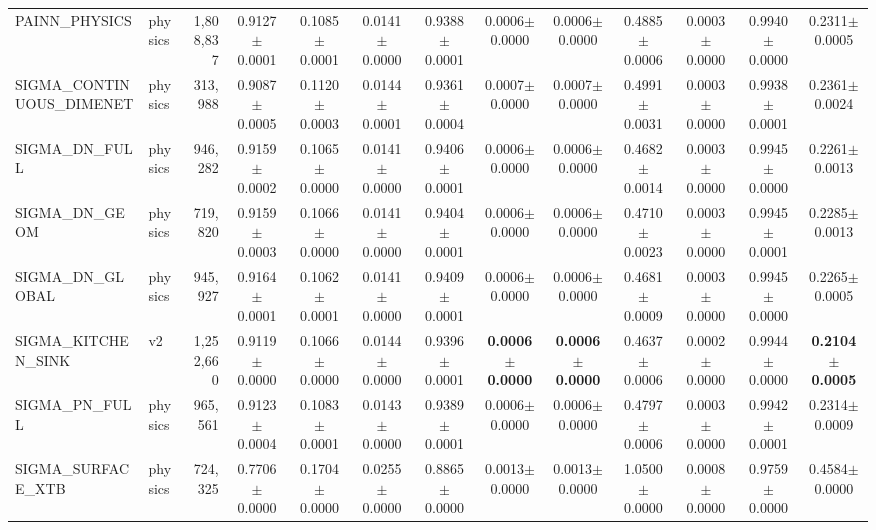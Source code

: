\begin{table}[ht]
\begin{tabular}{l l r c c c c c c c c c c }
PAINN_PHYSICS & physics & 1,808,837 & 0.9127$\pm$0.0001 & 0.1085$\pm$0.0001 & 0.0141$\pm$0.0000 & 0.9388$\pm$0.0001 & 0.0006$\pm$0.0000 & 0.0006$\pm$0.0000 & 0.4885$\pm$0.0006 & 0.0003$\pm$0.0000 & 0.9940$\pm$0.0000 & 0.2311$\pm$0.0005 \\
SIGMA_CONTINUOUS_DIMENET & physics & 313,988 & 0.9087$\pm$0.0005 & 0.1120$\pm$0.0003 & 0.0144$\pm$0.0001 & 0.9361$\pm$0.0004 & 0.0007$\pm$0.0000 & 0.0007$\pm$0.0000 & 0.4991$\pm$0.0031 & 0.0003$\pm$0.0000 & 0.9938$\pm$0.0001 & 0.2361$\pm$0.0024 \\
SIGMA_DN_FULL & physics & 946,282 & 0.9159$\pm$0.0002 & 0.1065$\pm$0.0000 & 0.0141$\pm$0.0000 & 0.9406$\pm$0.0001 & 0.0006$\pm$0.0000 & 0.0006$\pm$0.0000 & 0.4682$\pm$0.0014 & 0.0003$\pm$0.0000 & 0.9945$\pm$0.0000 & 0.2261$\pm$0.0013 \\
SIGMA_DN_GEOM & physics & 719,820 & 0.9159$\pm$0.0003 & 0.1066$\pm$0.0000 & 0.0141$\pm$0.0000 & 0.9404$\pm$0.0001 & 0.0006$\pm$0.0000 & 0.0006$\pm$0.0000 & 0.4710$\pm$0.0023 & 0.0003$\pm$0.0000 & 0.9945$\pm$0.0001 & 0.2285$\pm$0.0013 \\
SIGMA_DN_GLOBAL & physics & 945,927 & 0.9164$\pm$0.0001 & 0.1062$\pm$0.0001 & 0.0141$\pm$0.0000 & 0.9409$\pm$0.0001 & 0.0006$\pm$0.0000 & 0.0006$\pm$0.0000 & 0.4681$\pm$0.0009 & 0.0003$\pm$0.0000 & 0.9945$\pm$0.0000 & 0.2265$\pm$0.0005 \\
SIGMA_KITCHEN_SINK & v2 & 1,252,660 & 0.9119$\pm$0.0000 & 0.1066$\pm$0.0000 & 0.0144$\pm$0.0000 & 0.9396$\pm$0.0001 & \textbf{0.0006$\pm$0.0000} & \textbf{0.0006$\pm$0.0000} & 0.4637$\pm$0.0006 & 0.0002$\pm$0.0000 & 0.9944$\pm$0.0000 & \textbf{0.2104$\pm$0.0005} \\
SIGMA_PN_FULL & physics & 965,561 & 0.9123$\pm$0.0004 & 0.1083$\pm$0.0001 & 0.0143$\pm$0.0000 & 0.9389$\pm$0.0001 & 0.0006$\pm$0.0000 & 0.0006$\pm$0.0000 & 0.4797$\pm$0.0006 & 0.0003$\pm$0.0000 & 0.9942$\pm$0.0001 & 0.2314$\pm$0.0009 \\
SIGMA_SURFACE_XTB & physics & 724,325 & 0.7706$\pm$0.0000 & 0.1704$\pm$0.0000 & 0.0255$\pm$0.0000 & 0.8865$\pm$0.0000 & 0.0013$\pm$0.0000 & 0.0013$\pm$0.0000 & 1.0500$\pm$0.0000 & 0.0008$\pm$0.0000 & 0.9759$\pm$0.0000 & 0.4584$\pm$0.0000 \\
\bottomrule
\end{tabular}
\end{table}
